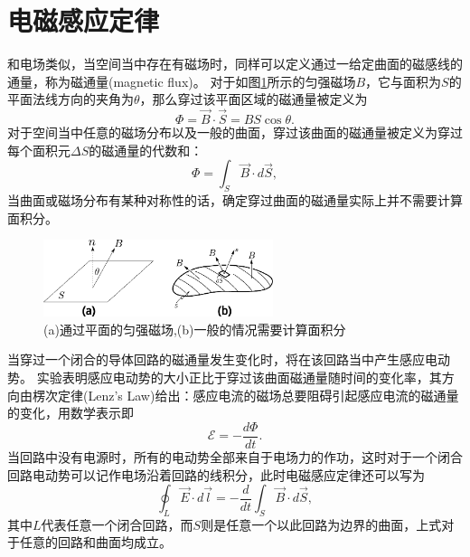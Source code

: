  \section{电磁感应定律}
和电场类似，当空间当中存在有磁场时，同样可以定义通过一给定曲面的磁感线的通量，称为{\heiti 磁通量}(magnetic flux)。
对于如图\ref{fig: 磁通量的定义}所示的匀强磁场$B$，它与面积为$S$的平面法线方向的夹角为$\theta$，那么穿过该平面区域的磁通量被定义为
\begin{equation}
\Phi = \vec{B}\cdot\vec{S} = BS\cos\theta.
\end{equation}
对于空间当中任意的磁场分布以及一般的曲面，穿过该曲面的磁通量被定义为穿过每个面积元$\Delta S$的磁通量的代数和：
\begin{equation}
\Phi = \int_S \vec{B}\cdot d\vec{S},
\end{equation}
当曲面或磁场分布有某种对称性的话，确定穿过曲面的磁通量实际上并不需要计算面积分。
\begin{figure}[hbtp]
\centering
\includegraphics[width = 0.6\textwidth]{images/mag-1.pdf}
\caption{(a)通过平面的匀强磁场,(b)一般的情况需要计算面积分}\label{fig: 磁通量的定义}
\end{figure}

当穿过一个闭合的导体回路的磁通量发生变化时，将在该回路当中产生感应电动势。
实验表明感应电动势的大小正比于穿过该曲面磁通量随时间的变化率，其方向由{\heiti 楞次定律}(Lenz's Law)给出：感应电流的磁场总要阻碍引起感应电流的磁通量的变化，用数学表示即
\begin{equation}\label{eqn: 电磁感应-电磁感应定律}
\mathcal{E} = -\frac{d\Phi}{dt}.
\end{equation}
当回路中没有电源时，所有的电动势全部来自于电场力的作功，这时对于一个闭合回路电动势可以记作电场沿着回路的线积分，此时电磁感应定律还可以写为
\begin{equation}
\oint_L \vec{E}\cdot d\vec{l} = -\frac{d}{dt}\int_S \vec{B}\cdot d\vec{S},
\end{equation}
其中$L$代表任意一个闭合回路，而$S$则是任意一个以此回路为边界的曲面，上式对于任意的回路和曲面均成立。


